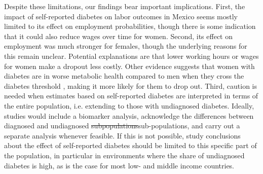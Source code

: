 \documentclass[12pt,english]{article}
\providecommand{\DIFaddtex}[1]{{\protect\color{blue}#1}} %
\providecommand{\DIFdeltex}[1]{{\protect\color{red}\sout{#1}}}                      %
\providecommand{\DIFaddbegin}{} %
\providecommand{\DIFaddend}{} %
\providecommand{\DIFdelbegin}{} %
\providecommand{\DIFdelend}{} %
\providecommand{\DIFadd}[1]{\texorpdfstring{\DIFaddtex{#1}}{#1}} %
\providecommand{\DIFdel}[1]{\texorpdfstring{\DIFdeltex{#1}}{}} %
\begin{document}
Despite these limitations, our findings bear important implications. First, the impact of self-reported diabetes on labor outcomes in Mexico seems mostly limited to its effect on employment probabilities, though there is some indication that it could also reduce wages over time for women.  Second, its effect on employment was much stronger for females, though the underlying reasons for this remain unclear. Potential explanations are that lower working hours or wages for women make \DIFaddbegin \DIFadd{a }\DIFaddend dropout less costly. Other evidence suggests that women with diabetes are in worse metabolic health compared to men when they cross the diabetes threshold \parencite{Peters2015}, making it more likely for them to drop out. Third, caution is needed when estimates based on self-reported diabetes are interpreted in terms of the entire population, i.e. extending to those with undiagnosed diabetes. Ideally, studies would  include a biomarker analysis, acknowledge the differences between diagnosed and undiagnosed \DIFdelbegin \DIFdel{subpopulations}\DIFdelend \DIFaddbegin \DIFadd{sub-populations}\DIFaddend , and carry out a separate analysis whenever feasible. If this is not possible, study conclusions about the effect of self-reported diabetes should be limited to this specific part of the population, in particular in environments where the share of undiagnosed diabetes is high, as is the case for most low- and middle income countries.
\end{document}
